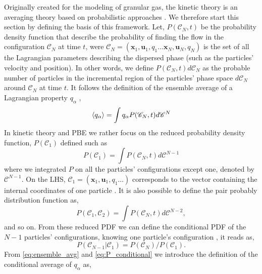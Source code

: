 Originally created for the modeling of granular gas, the kinetic theory is an averaging theory based on probabilistic approaches \citep{rao2008introduction,marchisio2013computational}. 
We therefore start this section by defining the basis of this framework.
Let, $P(\mathscr{C}_N,t)$ be the probability density function that describe the probability of finding the flow in the configuration $\mathscr{C}_N$ at time $t$, were $\mathscr{C}_N = (\textbf{x}_1,\textbf{u}_1,q_1\ldots\textbf{x}_N,\textbf{u}_N,q_N)$ is the set of all the Lagrangian parameters describing the dispersed phase (such as the particles' velocity and position).  
In other words, we define $P(\mathscr{C}_N,t)d\mathscr{C}_N$ as the probable number of particles in the incremental region of the particles' phase space $d\mathscr{C}_N$ around $\mathscr{C}_N$ at time $t$. 
It follows the definition of the ensemble average of a Lagrangian property $q_\alpha$ \citep{zhang1994ensemble},
\begin{equation}
    \left<q_\alpha\right>
    =\int q_\alpha P(\mathscr{C}_N,t)d\mathscr{C}^N
    \label{eq:ensemble_avg}
\end{equation}  
In kinetic theory and PBE we rather focus on the reduced probability density function, $P(\mathscr{C}_1)$ defined such as
\begin{equation}
    P(\mathscr{C}_1)
    = \int  P(\mathscr{C}_N,t) d\mathscr{C}^{N-1}
\end{equation} 
where we integrated $P$ on all the particles' configurations except one, denoted by $\mathscr{C}^{N-1}$.
On the LHS, $\mathscr{C}_1 =(\textbf{x}_1,\textbf{u}_1,q_1 \ldots) $ corresponds to the vector containing the internal coordinates of one particle \citep{rao2008introduction,zaepffel2011modelisation,fede2015monte,fox2012large}. 
It is also possible to define the pair probably distribution function as, 
\begin{equation*}
    P(\mathscr{C}_1,\mathscr{C}_2)
    = \int  P(\mathscr{C}_N,t) d\mathscr{C}^{N-2},
\end{equation*} 
and so on.
From these reduced PDF we can define the conditional PDF of the $N-1$ particles' configurations, knowing one particle's configuration \citep{batchelor1972sedimentation}, it reads as,
\begin{equation}
    P(\mathscr{C}_{N-1}|\mathscr{C}_{1}) 
    = P(\mathscr{C}_N)/ P(\mathscr{C}_1). 
    \label{eq:P_conditional}
\end{equation}
From \ref{eq:ensemble_avg} and \ref{eq:P_conditional} we introduce the definition of the conditional average of $q_\alpha$ as, 
